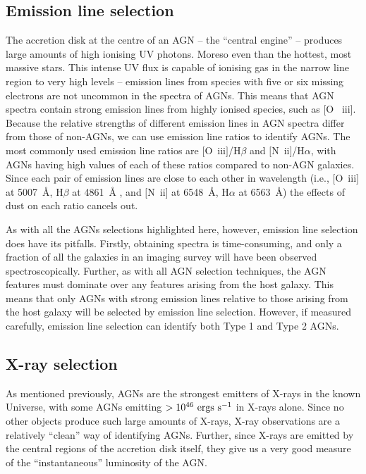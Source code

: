 \documentclass[11pt]{article}
\begin{document}
\subsection{Emission line selection}
The accretion disk at the centre of an AGN -- the ``central engine''
-- produces large amounts of high ionising UV photons. Moreso even
than the hottest, most massive stars. This intense UV flux is capable
of ionising gas in the narrow line region to very high levels --
emission lines from species with five or six missing electrons are not
uncommon in the spectra of AGNs. This means that AGN spectra contain
strong emission lines from highly ionised species, such as $[$O~{\sc
  iii}$]$. Because the relative strengths of different emission lines
in AGN spectra differ from those of non-AGNs, we can use emission line
ratios to identify AGNs. The most commonly used emission line ratios
are $[$O~{\sc iii}$]$/H$\beta$ and $[$N~{\sc ii}$]$/H$\alpha$, with
AGNs having high values of each of these ratios compared to non-AGN
galaxies. Since each pair of emission lines are close to each other in
wavelength (i.e., $[$O~{\sc iii}$]$ at 5007~\AA , H$\beta$ at 4861~\AA
, and $[$N~{\sc ii}$]$ at 6548~\AA , H$\alpha$ at 6563~\AA ) the
effects of dust on each ratio cancels out.

As with all the AGNs selections highlighted here, however, emission
line selection does have its pitfalls. Firstly, obtaining spectra is
time-consuming, and only a fraction of all the galaxies in an imaging
survey will have been observed spectroscopically. Further, as with all
AGN selection techniques, the AGN features must dominate over any
features arising from the host galaxy. This means that only AGNs with
strong emission lines relative to those arising from the host galaxy
will be selected by emission line selection. However, if measured
carefully, emission line selection can identify both Type 1 and Type 2
AGNs. 

\subsection{X-ray selection}
As mentioned previously, AGNs are the strongest emitters of X-rays in
the known Universe, with some AGNs emitting
$>10^{46}~{\rm ergs~s^{-1}}$ in X-rays alone. Since no other objects
produce such large amounts of X-rays, X-ray observations are a
relatively ``clean'' way of identifying AGNs. Further, since X-rays
are emitted by the central regions of the accretion disk itself, they
give us a very good measure of the ``instantaneous'' luminosity of
the AGN.
\end{document}
